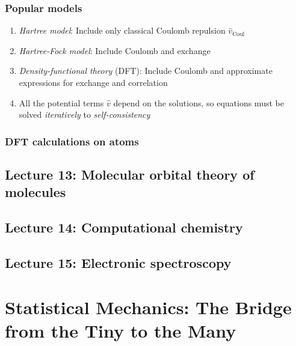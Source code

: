 \documentclass[11pt]{article}
\begin{document}
\subsubsection{Popular models}
\label{sec:orgff44507}
\begin{enumerate}
\item \emph{Hartree model}: Include only classical Coulomb repulsion \(\hat v_\mathrm{Coul}\)
\item \emph{Hartree-Fock model}: Include Coulomb and exchange
\item \emph{Density-functional theory} (DFT): Include Coulomb and
approximate expressions for exchange and correlation
\item All the potential terms \(\hat v\) depend on the solutions, so equations
must be solved \emph{iteratively} to \emph{self-consistency}
\end{enumerate}
\subsubsection{DFT calculations on atoms}
\label{sec:orgba34332}

\subsection{Lecture 13: Molecular orbital theory of molecules}
\label{sec:orgb9e76fc}
\subsection{Lecture 14: Computational chemistry}
\label{sec:org64604d0}
\subsection{Lecture 15: Electronic spectroscopy}
\label{sec:orge31934e}
\section{Statistical Mechanics: The Bridge from the Tiny to the Many}
\label{sec:org27c0687}
\end{document}
